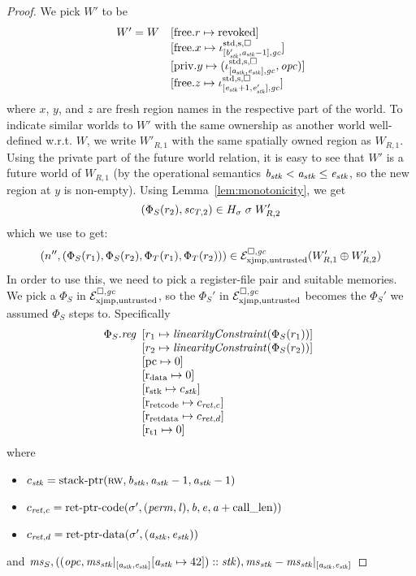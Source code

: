 \documentclass[a4paper]{article}
\begin{document}
\begin{proof}
We pick $W'$ to be
\[
  \begin{array}{r l}
    W' = W     & \update{\mathrm{free}.r}{\revoked}\\
               & \update{\mathrm{free}.x}{\stdreg{[\baddr_\stk',\aaddr_\stk -1],\gc}{\spa}}\\
               & \update{\mathrm{priv}.y}{(\stdreg{[\aaddr_\stk,\eaddr_\stk],\gc}{\spa},\opc)}\\
               & \update{\mathrm{free}.z}{\stdreg{[\eaddr_\stk+1,\eaddr_\stk'],\gc}{\spa}}
  \end{array}
\]
where $x$, $y$, and $z$ are fresh region names in the respective part of the world. To indicate similar worlds to $W'$ with the same ownership as another world well-defined w.r.t. $W$, we write $W'_{R,1}$ with the same spatially owned region as $W_{R,1}$. Using the private part of the future world relation, it is easy to see that $W'$ is a future world of $W_{R,1}$ (by the operational semantics $\baddr_\stk < \aaddr_\stk \leq \eaddr_\stk$, so the new region at $y$ is non-empty). Using Lemma~\ref{lem:monotonicity}, we get
\[
  (\Phi_S(r_2), \vsc_{T,2}) \in H_\sigma \; \sigma \; W'_{R,2}
\]
which we use to get:
\[
  \npair[n'']{(\Phi_S(r_1),\Phi_S(r_2),\Phi_T(r_1),\Phi_T(r_2))} \in \lrexj(W_{R,1}' \oplus W_{R,2}')
\]
In order to use this, we need to pick a register-file pair and suitable memories. We pick a $\Phi_S$ in $\lrexj$, so the $\Phi_S'$ in $\lrexj$ becomes the $\Phi_S'$ we assumed $\Phi_S$ steps to. Specifically
\[
  \Phi_S.\reg
  \begin{array}[t]{l}
    \update{r_1}{\linCons{\Phi_S(r_1)}}\\
    \update{r_2}{\linCons{\Phi_S(r_2)}}\\
    \update{\pcreg}{0} \\
    \update{\rdata}{0} \\
    \update{\rstk}{c_\stk}\\
    \update{\rretc}{c_{\ret,c}}\\
    \update{\rretd}{c_{\ret,d}}\\
    \update{\rtmp{1}}{0}\\
  \end{array}
\]
where
\begin{itemize}
\item $c_\stk = \stkptr{\rw,\baddr_\stk,\aaddr_\stk-1,\aaddr_\stk-1}$
\item $c_{\ret,c} = \retptrc(\sigma',(\perm,\lin),\baddr,\eaddr,\aaddr+\calllen))$
\item $c_{\ret,d} = \retptrd(\sigma',(\aaddr_\stk,\eaddr_\stk))$
\end{itemize}
and
$\ms_S,((\opc,\ms_\stk|_{[\aaddr_\stk,\eaddr_\stk]}\update{\aaddr_\stk}{42}) :: \stk),\ms_\stk-\ms_\stk|_{[\aaddr_\stk,\eaddr_\stk]}$


\end{proof}
\end{document}
